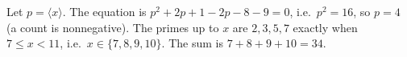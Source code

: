 Let $p=\langle x\rangle$. The equation is $p^2+2p+1-2p-8-9=0$, i.e.\ $p^2=16$, so $p=4$ (a count is nonnegative). The primes up to $x$ are $2,3,5,7$ exactly when $7\le x<11$, i.e.\ $x\in\{7,8,9,10\}$. The sum is $7+8+9+10=\boxed{34}$.
